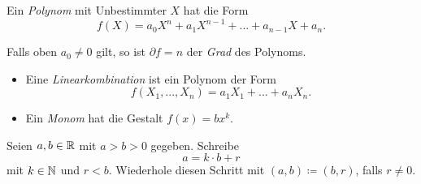 \documentclass{cheat-sheet}
\begin{document}





\begin{defn}
  Ein \emph{Polynom} mit Unbestimmter $X$ hat die Form
  \[ f(X) = a_0 X^n + a_1 X^{n-1} + ... + a_{n-1} X + a_n. \]
\end{defn}

\begin{defn}
  Falls oben $a_0 \not= 0$ gilt, so ist $\partial f = n$ der \emph{Grad} des Polynoms.
\end{defn}


\begin{defn}
  \begin{itemize}
    \item Eine \emph{Linearkombination} ist ein Polynom der Form
    \[ f(X_1, ..., X_n) = a_1 X_1 + ... + a_n X_n. \]
    \item Ein \emph{Monom} hat die Gestalt $f(x) = b x^k$.
  \end{itemize}
\end{defn}






\begin{alg}[Euklid]
  Seien $a, b \in \mathbb{R}$ mit $a {>} b {>} 0$ gegeben. Schreibe
  \[ a = k \cdot b + r \]
  mit $k \in \mathbb{N}$ und $r < b$. Wiederhole diesen Schritt mit $(a, b) \coloneqq (b, r)$, falls $r \not= 0$.
\end{alg}
\end{document}
